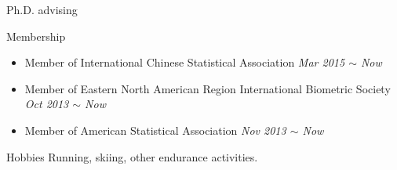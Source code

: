 \documentclass{resume} %
\begin{document}
\begin{rSection}{Ph.D. advising}
\end{rSection}


\begin{rSection}{Membership}
\begin{itemize}[noitemsep,topsep=0pt]
\item Member of International Chinese Statistical Association
        \hfill {\em Mar 2015 $\sim$ Now} 
\item Member of Eastern North American Region International Biometric Society
        \hfill {\em Oct 2013 $\sim$ Now} 
\item Member of American Statistical Association
        \hfill {\em Nov 2013 $\sim$ Now} 
\end{itemize}
\end{rSection}


\begin{rSection}{Hobbies}
Running, skiing, other endurance activities.


\end{rSection}
\end{document}
